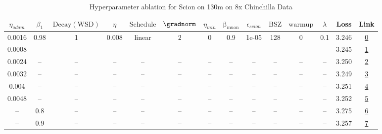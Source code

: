 \begin{table}[H]
\centering
\caption{Hyperparameter ablation for Scion on 130m on 8x Chinchilla Data}
\label{tab:ablation_scion_130m_on_8x_chinchilla_data}
\begin{tabular}{cccccccccccccc}
\toprule
$\eta_{adam}$ & $\beta_1$ & $\mathrm{Decay (WSD)}$ & $\eta$ & $\mathrm{Schedule}$ & $\gradnorm$ & $\eta_{min}$ & $\mathrm{\beta_{muon}}$ & $\epsilon_{scion}$ & $\mathrm{BSZ}$ & $\mathrm{warmup}$ & $\lambda$ & Loss & Link \\
\midrule
0.0016 & 0.98 & 1 & 0.008 & linear & 2 & 0 & 0.9 & 1e-05 & 128 & 0 & 0.1 & 3.246 & \href{https://wandb.ai/stanford-mercury/optimizer-scaling/runs/sweep-130m-21B-scion51ccaelr0.008-wd0.1-minlr0-warmup0-b10.98-gn-4abd83}{0} \\
\midrule
0.0008 & -- & -- & -- & -- & -- & -- & -- & -- & -- & -- & -- & 3.245 & \href{https://wandb.ai/stanford-mercury/optimizer-scaling/runs/sweep-130m-21B-scionpc9b6c6lr0.008-wd0.1-minlr0-warmup0-b10.98-g-847bd4}{1} \\
0.0024 & -- & -- & -- & -- & -- & -- & -- & -- & -- & -- & -- & 3.250 & \href{https://wandb.ai/stanford-mercury/optimizer-scaling/runs/sweep-130m-21B-scion2c2f99lr0.008-wd0.1-minlr0-warmup0-b10.98-gn-297c7d}{2} \\
0.0032 & -- & -- & -- & -- & -- & -- & -- & -- & -- & -- & -- & 3.249 & \href{https://wandb.ai/stanford-mercury/optimizer-scaling/runs/sweep-130m-21B-scion6d330dlr0.008-wd0.1-minlr0-warmup0-b10.98-gn-ee71b4}{3} \\
0.004 & -- & -- & -- & -- & -- & -- & -- & -- & -- & -- & -- & 3.251 & \href{https://wandb.ai/stanford-mercury/optimizer-scaling/runs/sweep-130m-21B-scion135c27lr0.008-wd0.1-minlr0-warmup0-b10.98-gn-e8fbd7}{4} \\
0.0048 & -- & -- & -- & -- & -- & -- & -- & -- & -- & -- & -- & 3.252 & \href{https://wandb.ai/stanford-mercury/optimizer-scaling/runs/sweep-130m-21B-scion1fa022lr0.008-wd0.1-minlr0-warmup0-b10.98-gn-bc1b5f}{5} \\
-- & 0.8 & -- & -- & -- & -- & -- & -- & -- & -- & -- & -- & 3.275 & \href{https://wandb.ai/stanford-mercury/optimizer-scaling/runs/sweep-130m-21B-scion1d7c34lr0.008-wd0.1-minlr0-warmup0-b10.8-gn2-fd6d80}{6} \\
-- & 0.9 & -- & -- & -- & -- & -- & -- & -- & -- & -- & -- & 3.257 & \href{https://wandb.ai/stanford-mercury/optimizer-scaling/runs/sweep-130m-21B-scion766235lr0.008-wd0.1-minlr0-warmup0-b10.9-gn2-b7a715}{7} \\

\end{tabular}
\end{table}
